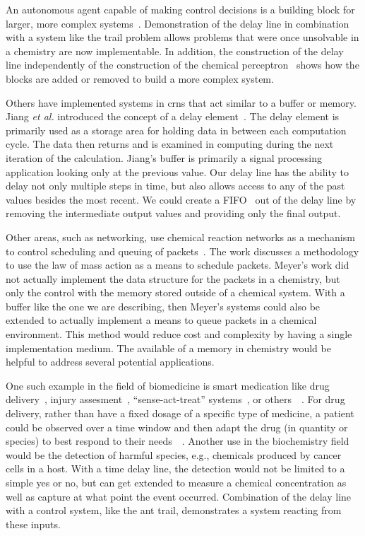 An autonomous agent capable of making control decisions is a building block for larger, more complex systems~\cite{Scheidt2002-bb}. Demonstration of the delay line in combination with a system like the trail problem allows problems that were once unsolvable in a chemistry are now implementable. In addition, the construction of the delay line independently of the construction of the chemical perceptron~\cite{Banda2013-zs} shows how the blocks are added or removed to build a more complex system.

Others have implemented systems in \glspl{crn} that act similar to a buffer or memory. Jiang \textit{et al.} introduced the concept of a delay element~\cite{Jiang2013-gq}. The delay element is primarily used as a storage area for holding data in between each computation cycle. The data then returns and is examined in computing during the next iteration of the calculation. Jiang's buffer is primarily a signal processing application looking only at the previous value. Our delay line has the ability to delay not only multiple steps in time, but also allows access to any of the past values besides the most recent. We could create a FIFO~\cite{Kanopoulos1986-of} out of the delay line by removing the intermediate output values and providing only the final output.

Other areas, such as networking, use chemical reaction networks as a mechanism to control scheduling and queuing of packets~\cite{Meyer2011-xn}. The work discusses a methodology to use the law of mass action as a means to schedule packets. Meyer's work did not actually implement the data structure for the packets in a chemistry, but only the control with the memory stored outside of a chemical system. With a buffer like the one we are describing, then Meyer's systems could also be extended to actually implement a means to queue packets in a chemical environment. This method would reduce cost and complexity by having a single implementation medium. The available of a memory in chemistry would be helpful to address several potential applications.

One such example in the field of biomedicine is smart medication like drug delivery~\cite{Neat1988-zv}, injury assesment~\cite{Halamek2010-lk}, ``sense-act-treat'' systems~\cite{Abbod2002-pt}, or others~\cite{Wang2010-se}~\cite{Zhou2012-jf}. For drug delivery, rather than have a fixed dosage of a specific type of medicine, a patient could be observed over a time window and then adapt the drug (in quantity or species) to best respond to their needs~\cite{Mailloux2014-ux}~\cite{Mailloux2014-de}. Another use in the biochemistry field would be the detection of harmful species, e.g., chemicals produced by cancer cells in a host. With a time delay line, the detection would not be limited to a simple yes or no, but can get extended to measure a chemical concentration as well as capture at what point the event occurred. Combination of the delay line with a control system, like the ant trail, demonstrates a system reacting from these inputs.

